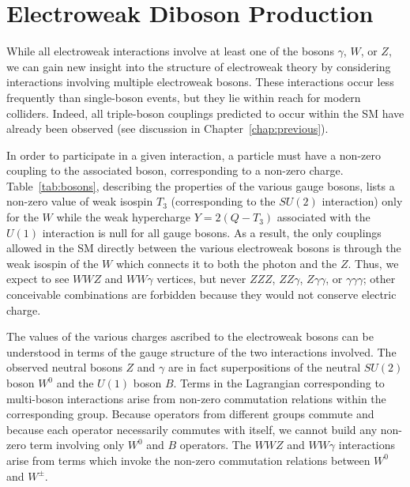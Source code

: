 \section{Electroweak Diboson Production}

While all electroweak interactions involve at least one of the bosons $\gamma$, $W$, or $Z$, we can gain new insight into the structure of electroweak theory by considering interactions involving multiple electroweak bosons.  These interactions occur less frequently than single-boson events, but they lie within reach for modern colliders.  Indeed, all triple-boson couplings predicted to occur within the SM have already been observed (see discussion in Chapter~\ref{chap:previous}).

In order to participate in a given interaction, a particle must have a non-zero coupling to the associated boson, corresponding to a non-zero charge.  Table~\ref{tab:bosons}, describing the properties of the various gauge bosons, lists a non-zero value of weak isospin $T_3$ (corresponding to the $SU(2)$ interaction) only for the $W$ while the weak hypercharge $Y = 2(Q - T_3)$ associated with the $U(1)$ interaction is null for all gauge bosons.  As a result, the only couplings allowed in the SM directly between the various electroweak bosons is through the weak isospin of the $W$ which connects it to both the photon and the $Z$.  Thus, we expect to see $WWZ$ and $WW\gamma$ vertices, but never $ZZZ$, $ZZ\gamma$, $Z\gamma\gamma$, or $\gamma\gamma\gamma$; other conceivable combinations are forbidden because they would not conserve electric charge.

The values of the various charges ascribed to the electroweak bosons can be understood in terms of the gauge structure of the two interactions involved.  The observed neutral bosons $Z$ and $\gamma$ are in fact superpositions of the neutral $SU(2)$ boson $W^0$ and the $U(1)$ boson $B$.  Terms in the Lagrangian corresponding to multi-boson interactions arise from non-zero commutation relations within the corresponding group.  Because operators from different groups commute and because each operator necessarily commutes with itself, we cannot build any non-zero term involving only $W^0$ and $B$ operators.  The $WWZ$ and $WW\gamma$ interactions arise from terms which invoke the non-zero commutation relations between $W^0$ and $W^\pm$.

